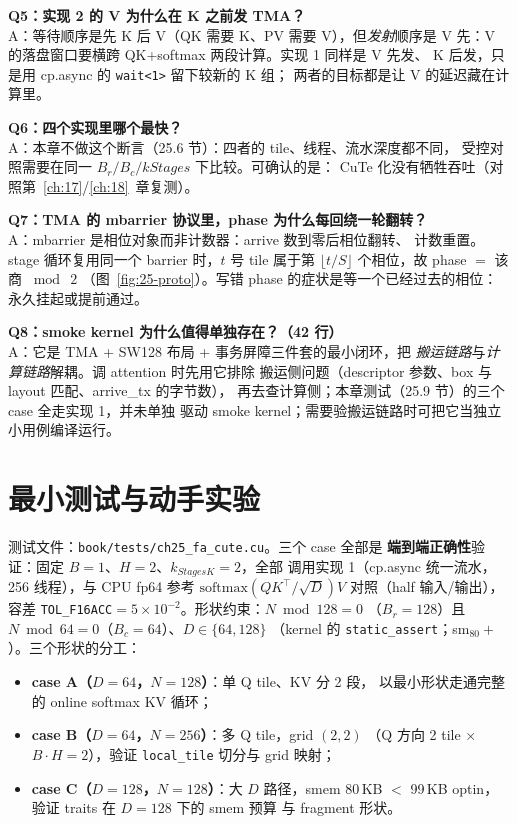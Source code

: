 \textbf{Q5：实现 2 的 V 为什么在 K 之前发 TMA？}\\
A：等待顺序是先 K 后 V（QK 需要 K、PV 需要 V），但\emph{发射}顺序是
V 先：V 的落盘窗口要横跨 QK+softmax 两段计算。实现 1 同样是 V 先发、
K 后发，只是用 cp.async 的 \texttt{wait<1>} 留下较新的 K 组；
两者的目标都是让 V 的延迟藏在计算里。

\textbf{Q6：四个实现里哪个最快？}\\
A：本章不做这个断言（25.6 节）：四者的 tile、线程、流水深度都不同，
受控对照需要在同一 $B_r/B_c/kStages$ 下比较。可确认的是：
CuTe 化没有牺牲吞吐（对照第~\ref{ch:17}/\ref{ch:18}~章复测）。

\textbf{Q7：TMA 的 mbarrier 协议里，phase 为什么每回绕一轮翻转？}\\
A：mbarrier 是相位对象而非计数器：arrive 数到零后相位翻转、
计数重置。stage 循环复用同一个 barrier 时，$t$ 号 tile 属于第
$\lfloor t/S\rfloor$ 个相位，故 phase $=$ 该商 $\bmod\ 2$
（图~\ref{fig:25-proto}）。写错 phase 的症状是等一个已经过去的相位：
永久挂起或提前通过。

\textbf{Q8：smoke kernel 为什么值得单独存在？（42 行）}\\
A：它是 TMA + SW128 布局 + 事务屏障三件套的最小闭环，把
\emph{搬运链路}与\emph{计算链路}解耦。调 attention 时先用它排除
搬运侧问题（descriptor 参数、box 与 layout 匹配、arrive\_tx 的字节数），
再去查计算侧；本章测试（25.9 节）的三个 case 全走实现 1，并未单独
驱动 smoke kernel；需要验搬运链路时可把它当独立小用例编译运行。

\section{最小测试与动手实验}

测试文件：\texttt{book/\allowbreak{}tests/\allowbreak{}ch25\_\allowbreak{}fa\_\allowbreak{}cute.\allowbreak{}cu}。三个 case 全部是
\textbf{端到端正确性}验证：固定 $B{=}1$、$H{=}2$、$k_{StagesK}{=}2$，全部
调用实现 1（cp.async 统一流水，256 线程），与 CPU fp64 参考
$\mathrm{softmax}(QK^\top/\sqrt{D})V$ 对照（half 输入/输出），容差
\texttt{TOL\_F16ACC}$=5\times10^{-2}$。形状约束：$N\bmod 128=0$
（$B_r{=}128$）且 $N\bmod 64=0$（$B_c{=}64$）、$D\in\{64,128\}$
（kernel 的 \texttt{static\_assert}；sm$_{80}+$）。三个形状的分工：

\begin{itemize}
  \item \textbf{case A（$D{=}64$，$N{=}128$）}：单 Q tile、KV 分 2 段，
        以最小形状走通完整的 online softmax KV 循环；
  \item \textbf{case B（$D{=}64$，$N{=}256$）}：多 Q tile，grid $(2,2)$
        （Q 方向 2 tile $\times$ $B{\cdot}H{=}2$），验证
        \texttt{local\_tile} 切分与 grid 映射；
  \item \textbf{case C（$D{=}128$，$N{=}128$）}：大 $D$ 路径，smem
        80\,KB $<$ 99\,KB optin，验证 traits 在 $D{=}128$ 下的 smem 预算
        与 fragment 形状。
\end{itemize}

